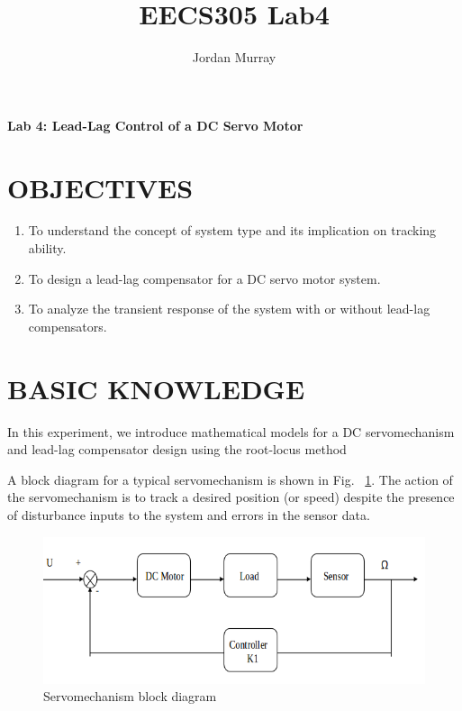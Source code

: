 \documentclass[11pt,a4paper]{article}
\author{Jordan Murray}
\title{EECS305 Lab4}
\begin{document}
\begin{center}
\fontsize{24}{12}\selectfont
\textbf{Lab 4: Lead-Lag Control of a DC Servo Motor}
\end{center}
\section{OBJECTIVES}
\begin{enumerate}
\item To understand the concept of system type and its implication on tracking ability.

\item To design a lead-lag compensator for a DC servo motor system.

\item To analyze the transient response of the system with or without lead-lag compensators.
\end{enumerate}

\section{BASIC KNOWLEDGE}
In this experiment, we introduce mathematical models for a DC servomechanism and lead-lag compensator design using the root-locus method

A block diagram for a typical servomechanism is shown in Fig. ~\ref{fig:servoblock}.  The action of the servomechanism is to track a desired position (or speed) despite the 
presence of disturbance inputs to the system and errors in the 
sensor data.

\begin{figure}[here]
\includegraphics[width=\textwidth]{imglab/servoblockdiagram.png}
\caption{Servomechanism block diagram}
\label{fig:servoblock}
\end{figure}
\end{document}
